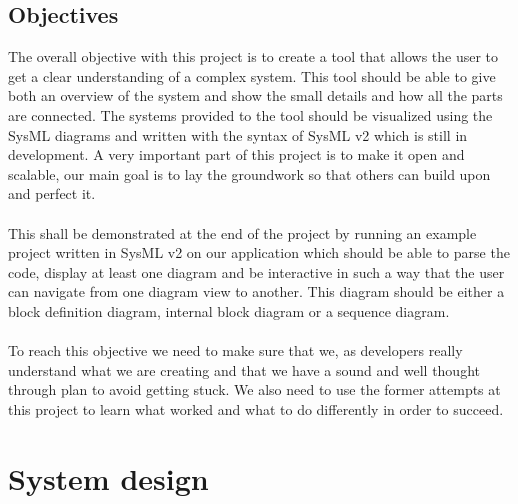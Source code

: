 \documentclass{article}
\begin{document}
\subsection{Objectives}
The overall objective with this project is to create a tool that allows the user to get a clear understanding of a complex system. This tool should be able to give both an overview of the system and show the small details and how all the parts are connected. The systems provided to the tool should be visualized using the SysML diagrams and written with the syntax of SysML v2 which is still in development. A very important part of this project is to make it open and scalable, our main goal is to lay the groundwork so that others can build upon and perfect it. 
\\\\
This shall be demonstrated at the end of the project by running an example project written in SysML v2 on our application which should be able to parse the code, display at least one diagram and be interactive in such a way that the user can navigate from one diagram view to another. This diagram should be either a block definition diagram, internal block diagram or a sequence diagram. 
\\\\
To reach this objective we need to make sure that we, as developers really understand what we are creating and that we have a sound and well thought through plan to avoid getting stuck. We also need to use the former attempts at this project to learn what worked and what to do differently in order to succeed.

\section{System design}\label{sec:system_design}
\end{document}
